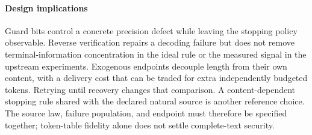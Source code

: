 \paragraph{Design implications}
Guard bits control a concrete precision defect while leaving the stopping
policy observable. Reverse verification repairs a decoding failure but does
not remove terminal-information concentration in the ideal rule or the
measured signal in the upstream experiments. Exogenous endpoints decouple length
from their own content, with a delivery cost that can be traded for extra
independently budgeted tokens. Retrying until recovery changes that comparison.
A content-dependent stopping rule shared with the declared natural source
is another reference choice. The source law, failure population, and endpoint
must therefore be specified together; token-table fidelity alone does not
settle complete-text security.
